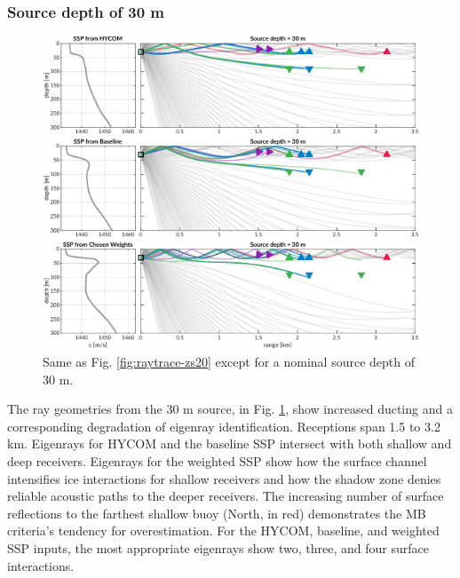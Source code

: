 \documentclass[preprint,TurnOnLineNumbers]{JASA}
\begin{document}
\subsubsection{Source depth of 30 m}
\begin{figure}[ht!]
  \centering
  \includegraphics[width=\columnwidth]{Fig7.pdf}
  \caption{Same as Fig. \ref{fig:raytrace-zs20} except for a nominal source depth of 30 m.}
  \label{fig:raytrace-zs30}
\end{figure}

The ray geometries from the 30 m source, in Fig. \ref{fig:raytrace-zs30}, show increased ducting and a corresponding degradation of eigenray identification.
Receptions span 1.5 to 3.2 km.
Eigenrays for HYCOM and the baseline SSP intersect with both shallow and deep receivers.
Eigenrays for the weighted SSP show how the surface channel intensifies ice interactions for shallow receivers and how the shadow zone denies reliable acoustic paths to the deeper receivers.
The increasing number of surface reflections to the farthest shallow buoy (North, in red) demonstrates the MB criteria's tendency for overestimation.
For the HYCOM, baseline, and weighted SSP inputs, the most appropriate eigenrays show two, three, and four surface interactions.
\end{document}
